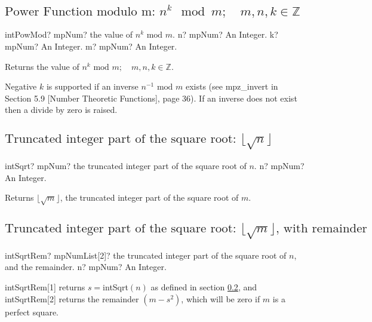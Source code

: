 \subsection{\texorpdfstring{$\text{Power Function modulo m: }n^k \mod m;  \quad m, n, k \in  \mathbb{Z}$}{powerxk}}

\begin{mpFunctionsExtract}
	\mpFunctionThree
	{intPowMod? mpNum? the value of $n^k \text{ mod } m$.}
	{n? mpNum? An Integer.}
	{k? mpNum? An Integer.}
	{m? mpNum? An Integer.}
\end{mpFunctionsExtract}

\vspace{0.3cm}
Returns the value of $n^k \text{ mod } m;   \quad m, n, k \in  \mathbb{Z}$.

Negative $k$ is supported if an inverse $n^{-1} \text{ mod } m$ exists (see mpz\_invert in Section 5.9 [Number Theoretic Functions], page 36). If an inverse does not exist then a divide by zero is raised.



\subsection{\texorpdfstring{$\text{Truncated integer part of the square root: }\lfloor\sqrt{n}\rfloor$}{sqrt}}

\label{intSqrt}
\begin{mpFunctionsExtract}
	\mpFunctionOne
	{intSqrt? mpNum? the truncated integer part of the square root of $n$.}
	{n? mpNum? An Integer.}
\end{mpFunctionsExtract}

\vspace{0.3cm}
Returns $\lfloor\sqrt{m}\rfloor$,  the truncated integer part of the square root of $m$.




\subsection{\texorpdfstring{$\text{Truncated integer part of the square root: }\lfloor\sqrt{m}\rfloor\text{, with remainder}$}{sqrt}}

\begin{mpFunctionsExtract}
	\mpFunctionOne
	{intSqrtRem? mpNumList[2]? the truncated integer part of the square root of $n$, and the remainder.}
	{n? mpNum? An Integer.}
\end{mpFunctionsExtract}

\vspace{0.3cm}
\textsf{intSqrtRem}[1] returns $s = $\textsf{intSqrt$(n)$} as defined in section \ref{intSqrt}, and \textsf{intSqrtRem}[2] returns  the remainder $(m - s^2)$, which will be
zero if $m$ is a perfect square.




